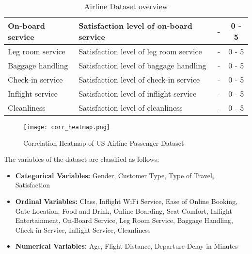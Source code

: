 \begin{landscape}
\begin{table}[h]
\begin{tabular}{|l|L|c|c|}
      On-board service & Satisfaction level of on-board service & - & 0 - 5
      \\\hline
      Leg room service & Satisfaction level of leg room service & - & 0 - 5
      \\\hline
      Baggage handling & Satisfaction level of baggage handling & - & 0 - 5
      \\\hline
      Check-in service & Satisfaction level of check-in service & - & 0 - 5
      \\\hline
      Inflight service & Satisfaction level of inflight service & - & 0 - 5
      \\\hline
      Cleanliness & Satisfaction level of cleanliness & - & 0 - 5 \\
      \hline
    \end{tabular}
    \caption{Airline Dataset overview}
    \label{table:airline_summary}
  \end{table}
  \end{landscape}

  \begin{figure}[h]
	  \centering
	  \texttt{[image: corr\_heatmap.png]}
	  \caption{Correlation Heatmap of US Airline Passenger Dataset}
      \label{fig:corr_heatmap}
  \end{figure}

  \noindent The variables of the dataset are classified as follows:

  \begin{itemize}
    \item \textbf{Categorical Variables:} Gender, Customer Type, Type of 
      Travel, Satisfaction
    \item \textbf{Ordinal Variables:} Class, Inflight WiFi Service, Ease of Online
      Booking, Gate Location, Food and Drink, Online Boarding, Seat Comfort,
      Inflight Entertainment, On-Board Service, Leg Room Service, Baggage
      Handling, Check-in Service, Inflight Service, Cleanliness
    \item \textbf{Numerical Variables:} Age, Flight Distance, Departure Delay in
      Minutes
  \end{itemize}

